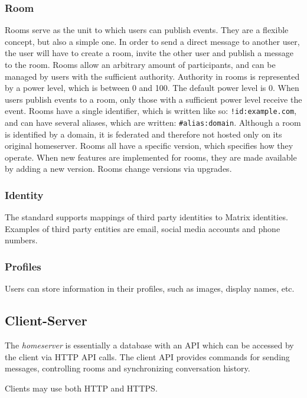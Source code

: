 \subsubsection{Room}
Rooms serve as the unit to which users can publish events.
They are a flexible concept, but also a simple one.
In order to send a direct message to another user, the user will have to create a room, invite the other user and publish a message to the room.
Rooms allow an arbitrary amount of participants, and can be managed by users with the sufficient authority.
Authority in rooms is represented by a power level, which is between 0 and 100.
The default power level is 0.
When users publish events to a room, only those with a sufficient power level receive the event.
Rooms have a single identifier, which is written like so: \texttt{!id:example.com}, and can have several aliases, which are written: \texttt{\#alias:domain}.
Although a room is identified by a domain, it is federated and therefore not hosted only on its original homeserver.
Rooms all have a specific version, which specifies how they operate.
When new features are implemented for rooms, they are made available by adding a new version.
Rooms change versions via upgrades.

\subsubsection{Identity}
The standard supports mappings of third party identities to Matrix identities.
Examples of third party entities are email, social media accounts and phone numbers.

\subsubsection{Profiles}
Users can store information in their profiles, such as images, display names, etc.

\subsection{Client-Server}
The \textit{homeserver} is essentially a database with an \ac{API} which can be accessed by the client via \ac{HTTP} \ac{API} calls.
The client \ac{API} provides commands for sending messages, controlling rooms and synchronizing conversation history.

Clients may use both \ac{HTTP} and \ac{HTTPS}.

